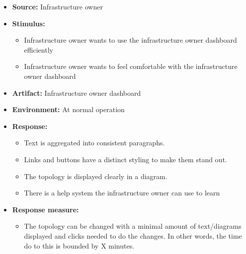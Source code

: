 \documentclass[english]{sareport}
\begin{document}
\begin{itemize}
    \item \textbf{Source:} Infrastructure owner
    \item \textbf{Stimulus:}
        \begin{itemize}
            \item Infrastructure owner wants to use the infrastructure owner
                  dashboard efficiently
            \item Infrastructure owner wants to feel comfortable with the
                  infrastructure owner dashboard
        \end{itemize}

    \item \textbf{Artifact:} Infrastructure owner dashboard
    \item \textbf{Environment:} At normal operation
    \item \textbf{Response:}
        \begin{itemize}
            \item Text is aggregated into consistent paragraphs.
            \item Links and buttons have a distinct styling to make them stand out.
            \item The topology is displayed clearly in a diagram.
            \item There is a help system the infrastructure owner can use to learn
        \end{itemize}

    \item \textbf{Response measure:}
        \begin{itemize}
            \item The topology can be changed with a minimal amount of text/diagrams
                  displayed and clicks needed to do the changes. In other words,
                  the time do to this is bounded by X minutes.
        \end{itemize}
\end{itemize}
\end{document}
